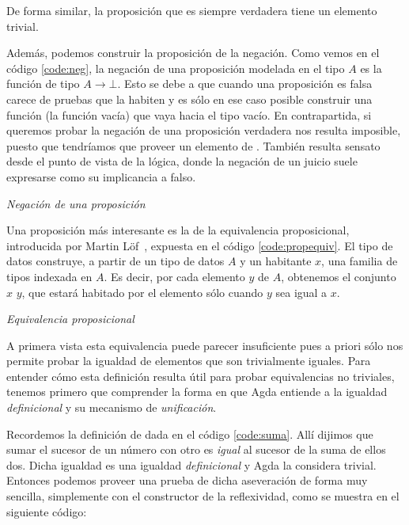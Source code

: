 De forma similar, la proposición que es siempre verdadera tiene un elemento trivial.


Además, podemos construir la proposición de la negación. Como vemos en el código \ref{code:neg}, la negación de una proposición modelada en el tipo $A$ es la función de tipo $A \to \bot$. Esto se debe a que cuando una proposición es falsa carece de pruebas que la habiten y es sólo en ese caso posible construir una función (la función vacía) que vaya hacia el tipo vacío. En contrapartida, si queremos probar la negación de una proposición verdadera nos resulta imposible, puesto que tendríamos que proveer un elemento de \AgdaDatatype{$\bot$}. También resulta sensato desde el punto de vista de la lógica, donde la negación de un juicio suele expresarse como su implicancia a falso. 

\begin{agdacode}{\it Negación de una proposición} \label{code:neg}

\end{agdacode}


Una proposición más interesante es la de la equivalencia proposicional, introducida por Martin Löf~\cite{Martin-Lof-1972,Martin-Lof-1973}, expuesta en el código \ref{code:propequiv}.
El tipo de datos \AgdaDatatype{$\_\equiv\_$} construye, a partir de un tipo de datos $A$ y un habitante $x$, una familia de tipos indexada en $A$. Es decir, por cada elemento $y$ de $A$, obtenemos el conjunto $x$ \AgdaDatatype{$\equiv$} $y$, que estará habitado por el elemento  sólo cuando $y$ sea igual a $x$. 

\begin{agdacode}{\it Equivalencia proposicional} \label{code:propequiv}

\end{agdacode}

A primera vista esta equivalencia puede parecer insuficiente pues a priori sólo nos permite probar la igualdad de elementos que son trivialmente iguales. Para entender cómo esta definición resulta útil para probar equivalencias no triviales, tenemos primero que comprender la forma en que Agda entiende a la igualdad {\it definicional} y su mecanismo de {\it unificación}.   

Recordemos la definición de  dada en el código \ref{code:suma}. Allí dijimos que sumar el sucesor de un número con otro es {\it igual} al sucesor de la suma de ellos dos. Dicha igualdad es una igualdad {\it definicional} y Agda la considera trivial. Entonces podemos proveer una prueba de dicha aseveración de forma muy sencilla, simplemente con el constructor de la reflexividad, como se muestra en el siguiente código:

